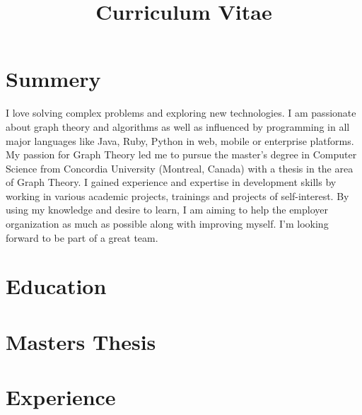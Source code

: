 \documentclass[11pt,a4paper,sans]{moderncv} %
\title{Curriculum Vitae}
\begin{document}
\makecvtitle %
\section{Summery}
I love solving complex problems and exploring new technologies. I am passionate about graph theory and algorithms as well as influenced by programming in all major languages like Java, Ruby, Python in web, mobile or enterprise platforms. My passion for Graph Theory led me to pursue the master's degree in Computer Science from Concordia University (Montreal, Canada) with a thesis in the area of Graph Theory. I gained experience and expertise in development skills by working in various academic projects, trainings and projects of self-interest. By using my knowledge and desire to learn, I am aiming to help the employer organization as much as possible along with improving myself. I'm looking forward to be part of a great team.


\section{Education}


\section{Masters Thesis}



\section{Experience}
\end{document}
